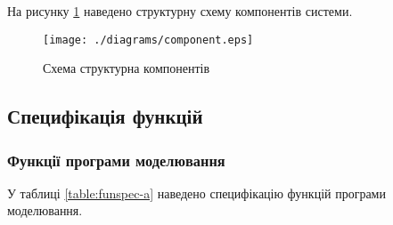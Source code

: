 На рисунку \ref{fig:component} наведено структурну схему компонентів системи.

\begin{figure}[here]
  \centering\texttt{[image: ./diagrams/component.eps]}
  \caption{Схема структурна компонентів}
  \label{fig:component}
\end{figure}

\newpage
\subsection{Специфікація функцій}

\subsubsection{Функції програми моделювання}

У таблиці \ref{table:funspec-a} наведено специфікацію функцій програми моделювання.

